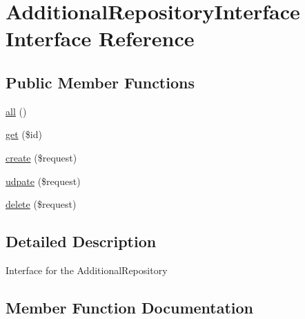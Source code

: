 \hypertarget{interface_app_1_1_repositories_1_1_product_1_1_additional_repository_interface}{}\section{Additional\+Repository\+Interface Interface Reference}
\label{interface_app_1_1_repositories_1_1_product_1_1_additional_repository_interface}
\subsection*{Public Member Functions}
\begin{DoxyCompactItemize}
\item 
\mbox{\hyperlink{interface_app_1_1_repositories_1_1_product_1_1_additional_repository_interface_af9d14e4ae6227970ad603987781573ca}{all}} ()
\item 
\mbox{\hyperlink{interface_app_1_1_repositories_1_1_product_1_1_additional_repository_interface_a50e3bfb586b2f42932a6a93f3fbb0828}{get}} (\$id)
\item 
\mbox{\hyperlink{interface_app_1_1_repositories_1_1_product_1_1_additional_repository_interface_a4fa811c83f27da01b0d92bdb2a711a13}{create}} (\$request)
\item 
\mbox{\hyperlink{interface_app_1_1_repositories_1_1_product_1_1_additional_repository_interface_a2aedea52c52e54ba3c4c9f60423e7ef1}{udpate}} (\$request)
\item 
\mbox{\hyperlink{interface_app_1_1_repositories_1_1_product_1_1_additional_repository_interface_a126a3799c44d72393ca4732081306dfd}{delete}} (\$request)
\end{DoxyCompactItemize}


\subsection{Detailed Description}
Interface for the Additional\+Repository 

\subsection{Member Function Documentation}
\mbox{\label{interface_app_1_1_repositories_1_1_product_1_1_additional_repository_interface_af9d14e4ae6227970ad603987781573ca}} 
